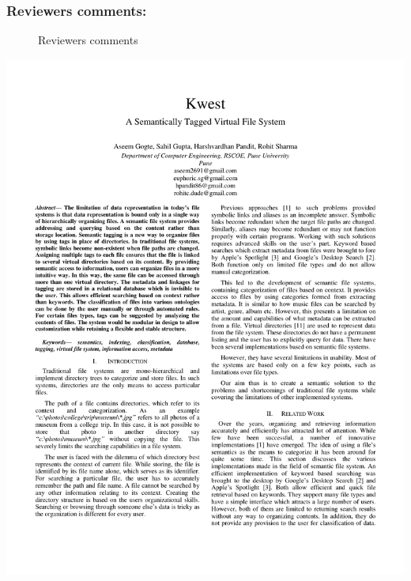 \subsubsection{Reviewers comments:}
\begin{figure}[htb]
\centering
\setlength\fboxsep{0pt}
\setlength\fboxrule{0.5pt}
\caption{Reviewers comments}
\label{fig:dfd0}
\end{figure}
\hspace*{-1.5cm}
\newpage
\includegraphics[page=1,scale=0.75]
{./appendix/sem1.pdf}



